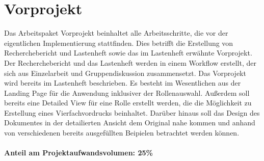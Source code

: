 \section{Vorprojekt} 
Das Arbeitspaket Vorprojekt beinhaltet alle Arbeitsschritte, die vor der 
eigentlichen Implementierung stattfinden. Dies betrifft die Erstellung von 
Recherchebericht und Lastenheft sowie das im Lastenheft erwähnte Vorprojekt. 
Der Recherchebericht und das Lastenheft werden in einem Workflow erstellt, 
der sich aus Einzelarbeit und Gruppendiskussion zusammensetzt. 
Das Vorprojekt wird bereits im Lastenheft beschrieben. Es besteht 
im Wesentlichen aus der Landing Page für die Anwendung inklusiver der 
Rollenauswahl. Außerdem soll bereits eine Detailed View für eine Rolle 
erstellt werden, die die Möglichkeit zu Erstellung eines Vierfachvordrucks 
beinhaltet. Darüber hinaus soll das Design des Dokumentes in der detailierten 
Ansicht dem Original nahe kommen und anhand von verschiedenen bereits 
ausgefüllten Beipielen betrachtet werden können. \\ \\
\textbf{Anteil am Projektaufwandsvolumen: 25\%}